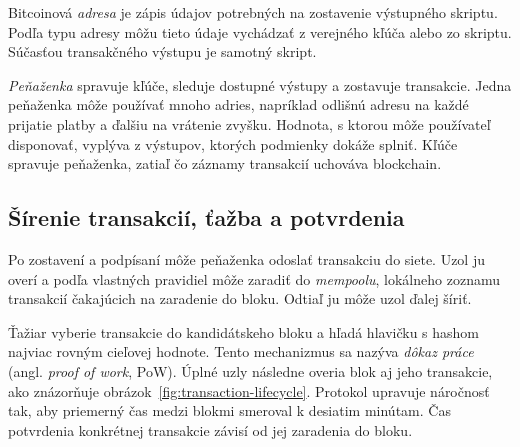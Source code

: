 Bitcoinová \emph{adresa} je zápis údajov potrebných
na zostavenie výstupného skriptu. Podľa typu adresy môžu tieto
údaje vychádzať z verejného kľúča alebo zo skriptu. Súčasťou
transakčného výstupu je samotný skript.

\emph{Peňaženka} spravuje kľúče, sleduje dostupné výstupy a zostavuje
transakcie. Jedna peňaženka môže používať mnoho adries, napríklad
odlišnú adresu na každé prijatie platby a ďalšiu na vrátenie zvyšku.
Hodnota, s ktorou môže používateľ disponovať, vyplýva z výstupov,
ktorých podmienky dokáže splniť. Kľúče spravuje peňaženka,
zatiaľ čo záznamy transakcií uchováva blockchain.

\subsection{Šírenie transakcií, ťažba a potvrdenia}
\label{sec:bitcoin-mining}

Po zostavení a podpísaní môže peňaženka odoslať transakciu do siete.
Uzol ju overí a podľa vlastných pravidiel môže zaradiť do
\emph{mempoolu}, lokálneho zoznamu transakcií čakajúcich na
zaradenie do bloku. Odtiaľ ju môže uzol ďalej šíriť.

Ťažiar vyberie transakcie do kandidátskeho bloku a hľadá hlavičku
s hashom najviac rovným cieľovej hodnote. Tento mechanizmus sa
nazýva \emph{dôkaz práce} (angl. \emph{proof of work}, PoW).
Úplné uzly následne overia blok aj jeho transakcie, ako znázorňuje
obrázok~\ref{fig:transaction-lifecycle}. Protokol upravuje náročnosť
tak, aby priemerný čas medzi blokmi smeroval k desiatim minútam.
Čas potvrdenia konkrétnej transakcie závisí od jej zaradenia
do bloku.

